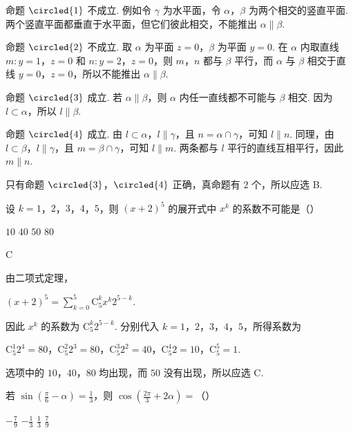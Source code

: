 \begin{solution}
命题 \(\circled{1}\) 不成立. 例如令 \(\gamma\) 为水平面，令 \(\alpha\)，\(\beta\) 为两个相交的竖直平面. 两个竖直平面都垂直于水平面，但它们彼此相交，不能推出 \(\alpha\parallel\beta\).

命题 \(\circled{2}\) 不成立. 取 \(\alpha\) 为平面 \(z=0\)，\(\beta\) 为平面 \(y=0\). 在 \(\alpha\) 内取直线 \(m\colon y=1\)，\(z=0\) 和 \(n\colon y=2\)，\(z=0\)，则 \(m\)，\(n\) 都与 \(\beta\) 平行，而 \(\alpha\) 与 \(\beta\) 相交于直线 \(y=0\)，\(z=0\)，所以不能推出 \(\alpha\parallel\beta\).

命题 \(\circled{3}\) 成立. 若 \(\alpha\parallel\beta\)，则 \(\alpha\) 内任一直线都不可能与 \(\beta\) 相交. 因为 \(l\subset\alpha\)，所以 \(l\parallel\beta\).

命题 \(\circled{4}\) 成立. 由 \(l\subset\alpha\)，\(l\parallel\gamma\)，且 \(n=\alpha\cap\gamma\)，可知 \(l\parallel n\). 同理，由 \(l\subset\beta\)，\(l\parallel\gamma\)，且 \(m=\beta\cap\gamma\)，可知 \(l\parallel m\). 两条都与 \(l\) 平行的直线互相平行，因此 \(m\parallel n\).

只有命题 \(\circled{3}\)，\(\circled{4}\) 正确，真命题有 \(2\) 个，所以应选 B.
\end{solution}

\begin{problem}
设 \(k = 1\)，\(2\)，\(3\)，\(4\)，\(5\)，则 \((x + 2)^5\) 的展开式中 \(x^k\) 的系数不可能是（\quad）

\choices
    {\(10\)}
    {\(40\)}
    {\(50\)}
    {\(80\)}
\end{problem}

\begin{answer}
C
\end{answer}

\begin{solution}
由二项式定理，

\((x+2)^5=\displaystyle\sum_{k=0}^{5}\mathrm C_{5}^{k}x^k2^{5-k}\).

因此 \(x^k\) 的系数为 \(\mathrm C_{5}^{k}2^{5-k}\). 分别代入 \(k=1\)，\(2\)，\(3\)，\(4\)，\(5\)，所得系数为

\(\mathrm C_{5}^{1}2^4=80\)，\(\mathrm C_{5}^{2}2^3=80\)，\(\mathrm C_{5}^{3}2^2=40\)，\(\mathrm C_{5}^{4}2=10\)，\(\mathrm C_{5}^{5}=1\).

选项中的 \(10\)，\(40\)，\(80\) 均出现，而 \(50\) 没有出现，所以应选 C.
\end{solution}

\begin{problem}
若 \(\sin \left(\frac{\pi}{6} - \alpha\right) = \frac{1}{3}\)，则 \(\cos \left(\frac{2\pi}{3} + 2\alpha\right) =\)（\quad）

\choices
    {\(\displaystyle -\frac{7}{9}\)}
    {\(\displaystyle -\frac{1}{3}\)}
    {\(\displaystyle \frac{1}{3}\)}
    {\(\displaystyle \frac{7}{9}\)}
\end{problem}

